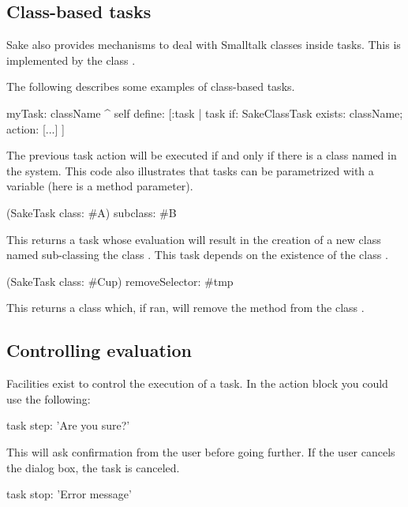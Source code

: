\documentclass[a4paper,10pt,twoside]{book}
\begin{document}
\subsection{Class-based tasks}

Sake also provides mechanisms to deal with Smalltalk classes inside
tasks. This is implemented by the class .

The following describes some examples of class-based tasks.

\begin{code}{}
myTask: className
  ^ self define: [:task |
      task
        if: {SakeClassTask exists: className};
        action: [...]
    ]
\end{code}

The previous task action will be executed if and only if there is a
class named  in the system. This code also illustrates
that tasks can be parametrized with a variable (here  is
a method parameter).

\begin{code}{}
(SakeTask class: #A) subclass: #B
\end{code}

This returns a task whose evaluation will result in the creation of a
new class named  sub-classing the class . This task
depends on the existence of the class .

\begin{code}{}
(SakeTask class: #Cup) removeSelector: #tmp
\end{code}

This returns a class which, if ran, will remove the method 
from the class .

\subsection{Controlling evaluation}

Facilities exist to control the execution of a task. In the action block you could use the following:

\begin{code}{}
task step: 'Are you sure?'
\end{code}

This will ask confirmation from the user before going further. If the user cancels the dialog box, the task is canceled.

\begin{code}{}
task stop: 'Error message'
\end{code}
\end{document}

